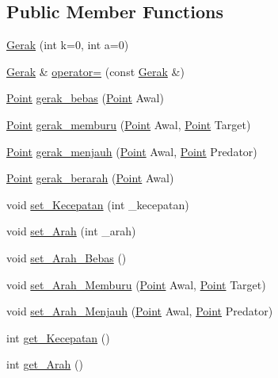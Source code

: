 \subsection*{Public Member Functions}
\begin{DoxyCompactItemize}
\item 
\hyperlink{class_gerak_a02d91105bf6d068a736b83cb8384771d}{Gerak} (int k=0, int a=0)
\item 
\hyperlink{class_gerak}{Gerak} \& \hyperlink{class_gerak_a305ed06e393e3e51cfca2ef6e7c76afb}{operator=} (const \hyperlink{class_gerak}{Gerak} \&)
\item 
\hyperlink{class_point}{Point} \hyperlink{class_gerak_af22d628d35499daa0531c7ec33bc203c}{gerak\+\_\+bebas} (\hyperlink{class_point}{Point} Awal)
\item 
\hyperlink{class_point}{Point} \hyperlink{class_gerak_ad5580d6323e4c6b4ef8df2b66ae0e3d4}{gerak\+\_\+memburu} (\hyperlink{class_point}{Point} Awal, \hyperlink{class_point}{Point} Target)
\item 
\hyperlink{class_point}{Point} \hyperlink{class_gerak_a35bd72ee39648608e80e3a6e64529629}{gerak\+\_\+menjauh} (\hyperlink{class_point}{Point} Awal, \hyperlink{class_point}{Point} Predator)
\item 
\hyperlink{class_point}{Point} \hyperlink{class_gerak_a523d205606d855b9776ef64f92cc756e}{gerak\+\_\+berarah} (\hyperlink{class_point}{Point} Awal)
\item 
void \hyperlink{class_gerak_aeb2593139ccb712e979d2be884f7b964}{set\+\_\+\+Kecepatan} (int \+\_\+kecepatan)
\item 
void \hyperlink{class_gerak_a79f2c0d4777b7fdf7828783b4b6ebf59}{set\+\_\+\+Arah} (int \+\_\+arah)
\item 
void \hyperlink{class_gerak_a2b06276ef18ad27ab8cbe71655e9c198}{set\+\_\+\+Arah\+\_\+\+Bebas} ()
\item 
void \hyperlink{class_gerak_a0d31d49a0104e4d823bbfc2881a0f599}{set\+\_\+\+Arah\+\_\+\+Memburu} (\hyperlink{class_point}{Point} Awal, \hyperlink{class_point}{Point} Target)
\item 
void \hyperlink{class_gerak_a8a5617adee7b2c7d67b0f4571ca4b448}{set\+\_\+\+Arah\+\_\+\+Menjauh} (\hyperlink{class_point}{Point} Awal, \hyperlink{class_point}{Point} Predator)
\item 
int \hyperlink{class_gerak_a7c19aee88213b75f332d286458069ccd}{get\+\_\+\+Kecepatan} ()
\item 
int \hyperlink{class_gerak_ae808d0044c5221cf7e265fb43288b51b}{get\+\_\+\+Arah} ()
\end{DoxyCompactItemize}


